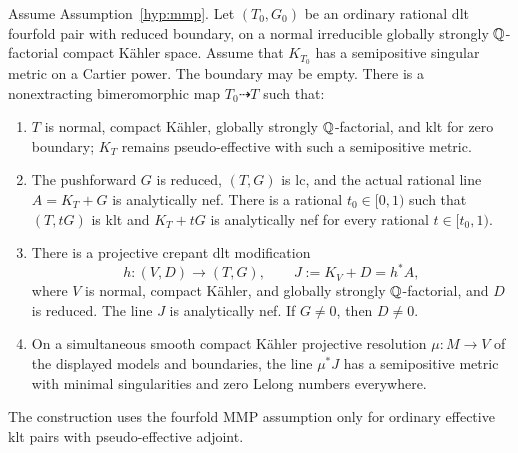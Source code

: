 \begin{proposition}
\label{bir:reduced-model}
Assume Assumption~\ref{hyp:mmp}.  Let $(T_0,G_0)$ be an ordinary
rational dlt fourfold pair with reduced boundary, on a normal
irreducible globally strongly $\mathbb{Q}$-factorial compact K\"ahler space.
Assume that $K_{T_0}$ has a semipositive singular metric on a Cartier
power.  The boundary may be empty.  There is a nonextracting
bimeromorphic map $T_0\dashrightarrow T$ such that:
\begin{enumerate}[label=\textup{(\roman*)}]
\item $T$ is normal, compact K\"ahler, globally strongly
$\mathbb{Q}$-factorial, and klt for zero boundary; $K_T$ remains
pseudo-effective with such a semipositive metric.
\item The pushforward $G$ is reduced, $(T,G)$ is lc, and the
actual rational line $A=K_T+G$ is analytically nef.  There is a
rational $t_0\in[0,1)$ such that $(T,tG)$ is klt and
$K_T+tG$ is analytically nef for every rational
$t\in[t_0,1)$.
\item There is a projective crepant dlt modification
\begin{equation}
 h:(V,D)\longrightarrow(T,G),\qquad
 J:=K_V+D=h^*A,
 \label{bir:reduced-adjoint}
\end{equation}
where $V$ is normal, compact K\"ahler, and globally strongly
$\mathbb{Q}$-factorial, and $D$ is reduced.  The line $J$ is analytically
nef.  If $G\ne0$, then $D\ne0$.
\item On a simultaneous smooth compact K\"ahler projective
resolution $\mu:M\to V$ of the displayed models and boundaries,
the line $\mu^*J$ has a semipositive metric with minimal
singularities and zero Lelong numbers everywhere.
\end{enumerate}
The construction uses the fourfold MMP assumption only for ordinary
effective klt pairs with pseudo-effective adjoint.
\end{proposition}

